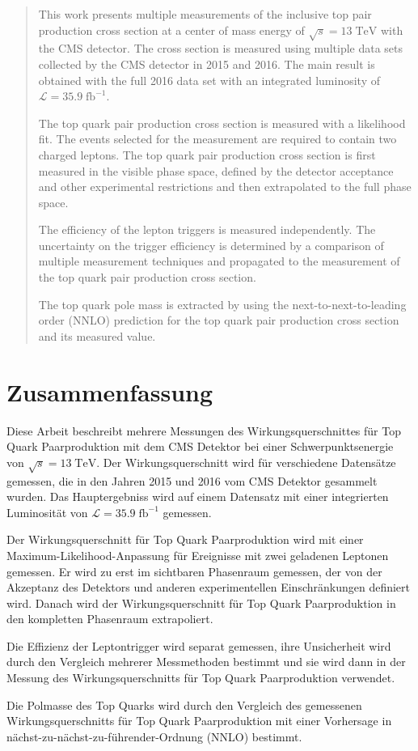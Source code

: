 \begin{abstract}
This work presents multiple measurements of the inclusive top pair production cross section at a center of mass energy of $\sqrt{s}=13 \; \mathrm{TeV}$ with the CMS detector.
The cross section is measured using multiple data sets collected by the CMS detector in 2015 and 2016. The main result is obtained with the full 2016 data set with an integrated
luminosity of $\mathcal{L}=35.9 \;\mathrm{fb}^{-1}$. 

The top quark pair production cross section is measured with a likelihood fit.
The events selected for the measurement are required to contain two charged leptons.
The top quark pair production cross section is first measured in the visible phase space,
defined by the detector acceptance and other experimental restrictions and then extrapolated to the full phase space.

The efficiency of the lepton triggers is measured independently. The uncertainty on the trigger efficiency is determined by a comparison of multiple measurement techniques and propagated
to the measurement of the top quark pair production cross section.

The top quark pole mass is extracted by using the next-to-next-to-leading order (NNLO) prediction for the top quark pair production cross section and its measured value. 
\end{abstract}

\chapter*{\centering \Large Zusammenfassung} 

Diese Arbeit beschreibt mehrere Messungen des Wirkungsquerschnittes für Top Quark Paarproduktion mit dem CMS Detektor bei einer Schwerpunktsenergie von $\sqrt{s}=13 \; \mathrm{TeV}$.
Der Wirkungsquerschnitt wird für verschiedene Datensätze gemessen, die in den Jahren 2015 und 2016 vom CMS Detektor gesammelt wurden.
Das Hauptergebniss wird auf einem Datensatz mit einer integrierten Luminosität von $\mathcal{L}=35.9 \;\mathrm{fb}^{-1}$ gemessen.

Der Wirkungsquerschnitt für Top Quark Paarproduktion wird mit einer Maximum-Likelihood-Anpassung für Ereignisse mit zwei geladenen Leptonen gemessen.
Er wird zu erst im sichtbaren Phasenraum gemessen, der von der Akzeptanz des Detektors und anderen experimentellen Einschränkungen definiert wird.
Danach wird der Wirkungsquerschnitt für Top Quark Paarproduktion in den kompletten Phasenraum extrapoliert.

Die Effizienz der Leptontrigger wird separat gemessen, ihre Unsicherheit wird durch den Vergleich mehrerer Messmethoden bestimmt und sie wird dann in der Messung des Wirkungsquerschnitts für Top Quark Paarproduktion verwendet.

Die Polmasse des Top Quarks wird durch den Vergleich des gemessenen Wirkungsquerschnitts für Top Quark Paarproduktion mit einer Vorhersage in nächst-zu-nächst-zu-führender-Ordnung (NNLO) bestimmt.




